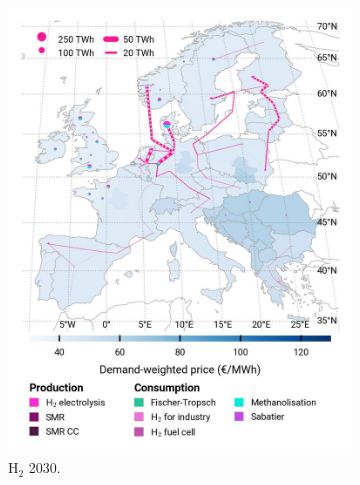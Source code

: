 \documentclass[pdflatex,sn-nature]{sn-jnl}%
\theoremstyle{thmstyleone}%
\theoremstyle{thmstyletwo}%
\theoremstyle{thmstylethree}%
\begin{document}
\begin{figure}[htbp]
  \centering
  \begin{subfigure}[t]{0.32\textwidth}
      \vspace{0pt}
      \includegraphics[width=1\textwidth]{figures/maps/pcipmi/base_s_adm___2030-balance_map_H2.jpg}
      \caption{H$_2$ 2030.}
      \label{fig:PCI_lt_2030_h2}
  \end{subfigure}
  \begin{subfigure}[t]{0.32\textwidth}
      \vspace{0pt}

\end{subfigure}
\end{figure}
\end{document}
